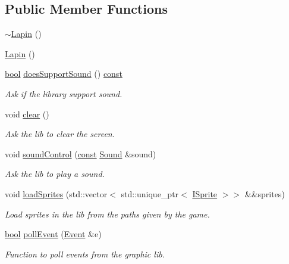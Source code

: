 \subsection*{Public Member Functions}
\begin{DoxyCompactItemize}
\item 
\hyperlink{classarcade_1_1_lapin_ae2490de966029d69df9d591a18a9d45c}{$\sim$\-Lapin} ()
\item 
\hyperlink{classarcade_1_1_lapin_a8d583dbae3df65d066cf799085ae6000}{Lapin} ()
\item 
\hyperlink{term__entry_8h_a002004ba5d663f149f6c38064926abac}{bool} \hyperlink{classarcade_1_1_lapin_a34cb3f58188a6ff0ade94bd24320547f}{does\-Support\-Sound} () \hyperlink{term__entry_8h_a57bd63ce7f9a353488880e3de6692d5a}{const} 
\begin{DoxyCompactList}\small\item\em Ask if the library support sound. \end{DoxyCompactList}\item 
void \hyperlink{classarcade_1_1_lapin_a4b043e858f23034b942e6fb887688b84}{clear} ()
\begin{DoxyCompactList}\small\item\em Ask the lib to clear the screen. \end{DoxyCompactList}\item 
void \hyperlink{classarcade_1_1_lapin_a96b9054a64f7ca3cdf869ffb6be7f0d9}{sound\-Control} (\hyperlink{term__entry_8h_a57bd63ce7f9a353488880e3de6692d5a}{const} \hyperlink{structarcade_1_1_sound}{Sound} \&sound)
\begin{DoxyCompactList}\small\item\em Ask the lib to play a sound. \end{DoxyCompactList}\item 
void \hyperlink{classarcade_1_1_lapin_a3578cca0004ff22d70183a2fc5d3d3b4}{load\-Sprites} (std\-::vector$<$ std\-::unique\-\_\-ptr$<$ \hyperlink{classarcade_1_1_i_sprite}{I\-Sprite} $>$$>$ \&\&sprites)
\begin{DoxyCompactList}\small\item\em Load sprites in the lib from the paths given by the game. \end{DoxyCompactList}\item 
\hyperlink{term__entry_8h_a002004ba5d663f149f6c38064926abac}{bool} \hyperlink{classarcade_1_1_lapin_adaa52d31c23ba7205aaa31a5a8de9191}{poll\-Event} (\hyperlink{structarcade_1_1_event}{Event} \&e)
\begin{DoxyCompactList}\small\item\em Function to poll events from the graphic lib. \end{DoxyCompactList}\item 
$$
\end{DoxyCompactItemize}
